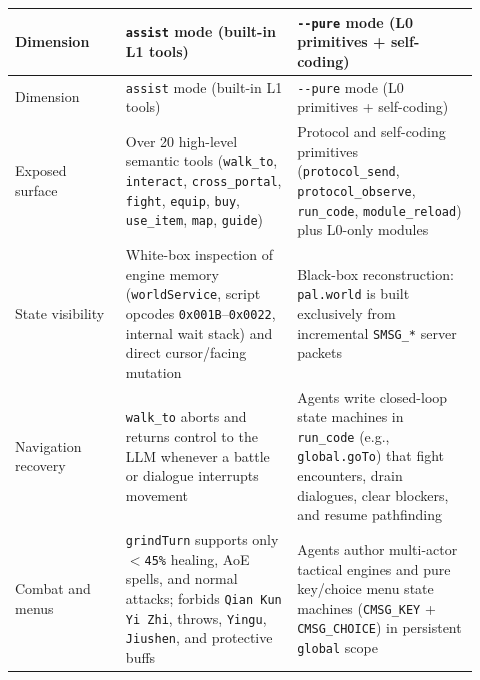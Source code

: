 \documentclass[11pt,a4paper]{article}
\begin{document}
{\small\setlength{\tabcolsep}{3pt}
\begin{longtable}{@{}>{\RaggedRight\arraybackslash}p{0.22\linewidth}>{\RaggedRight\arraybackslash}p{0.34\linewidth}>{\RaggedRight\arraybackslash}p{0.36\linewidth}@{}}
\toprule
Dimension & \texttt{assist} mode (built-in L1 tools) & \texttt{-\allowbreak{}-\allowbreak{}pure} mode (L0 primitives + self-coding) \\
\midrule\endfirsthead
\toprule
Dimension & \texttt{assist} mode (built-in L1 tools) & \texttt{-\allowbreak{}-\allowbreak{}pure} mode (L0 primitives + self-coding) \\
\midrule\endhead
\bottomrule\endfoot
Exposed surface & Over 20 high-level semantic tools (\texttt{walk\allowbreak{}\_\allowbreak{}to}, \texttt{interact}, \texttt{cross\allowbreak{}\_\allowbreak{}portal}, \texttt{fight}, \texttt{equip}, \texttt{buy}, \texttt{use\allowbreak{}\_\allowbreak{}item}, \texttt{map}, \texttt{guide}) & Protocol and self-coding primitives (\texttt{protocol\allowbreak{}\_\allowbreak{}send}, \texttt{protocol\allowbreak{}\_\allowbreak{}observe}, \texttt{run\allowbreak{}\_\allowbreak{}code}, \texttt{module\allowbreak{}\_\allowbreak{}reload}) plus L0-only modules \\
State visibility & White-box inspection of engine memory (\texttt{worldSer\allowbreak{}vice}, script opcodes \texttt{0x001B}--\texttt{0x0022}, internal wait stack) and direct cursor/facing mutation & Black-box reconstruction: \texttt{pal\allowbreak{}.\allowbreak{}world} is built exclusively from incremental \texttt{SMSG\allowbreak{}\_\allowbreak{}*} server packets \\
Navigation recovery & \texttt{walk\allowbreak{}\_\allowbreak{}to} aborts and returns control to the LLM whenever a battle or dialogue interrupts movement & Agents write closed-loop state machines in \texttt{run\allowbreak{}\_\allowbreak{}code} (e.g., \texttt{global\allowbreak{}.\allowbreak{}goTo}) that fight encounters, drain dialogues, clear blockers, and resume pathfinding \\
Combat and menus & \texttt{grindTurn} supports only \texttt{\ensuremath{<}45\%} healing, AoE spells, and normal attacks; forbids \texttt{Qian\allowbreak{} \allowbreak{}Kun\allowbreak{} \allowbreak{}Yi\allowbreak{} \allowbreak{}Zhi}, throws, \texttt{Yingu}, \texttt{Jiushen}, and protective buffs & Agents author multi-actor tactical engines and pure key/choice menu state machines (\texttt{CMSG\allowbreak{}\_\allowbreak{}KEY} + \texttt{CMSG\allowbreak{}\_\allowbreak{}CHOICE}) in persistent \texttt{global} scope \\
\end{longtable}
}
\end{document}
